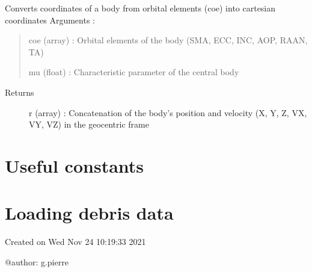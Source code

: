 \documentclass[letterpaper,10pt,english]{sphinxmanual}
\begin{document}

\begin{fulllineitems}
\label{\detokenize{utils:utils.coc.kep2cart}}
Converts coordinates of a body from orbital elements (coe) into cartesian coordinates 
Arguments :
\begin{quote}

coe (array) : Orbital elements of the body (SMA, ECC, INC, AOP, RAAN, TA)

mu (float) : Characteristic parameter of the central body
\end{quote}
\begin{description}
\item[{Returns}] \leavevmode{[}{]}
r (array) : Concatenation of the body’s position and velocity (X, Y, Z, VX, VY, VZ) in the geocentric frame

\end{description}

\end{fulllineitems}



\section{Useful constants}
\label{\detokenize{utils:useful-constants}}\label{\detokenize{utils:module-utils.constants}}

\section{Loading debris data}
\label{\detokenize{utils:loading-debris-data}}\label{\detokenize{utils:module-utils.debris_data_loader}}
Created on Wed Nov 24 10:19:33 2021

@author: g.pierre
\end{document}
